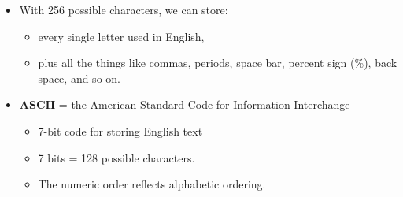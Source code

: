 \documentclass[a4paper,landscape,headrule,footrule,xetex]{foils}
\begin{document}

\begin{itemize}
\item  With 256 possible characters, we can store:
  \begin{itemize}
  \item every single letter used in English,
  \item plus all the things like commas, periods, space bar, percent sign (\%), back space, and so on.
  \end{itemize}
\item \textbf{ASCII} = the American Standard Code for Information Interchange
  \begin{itemize}
  \item  7-bit code for storing English text
  \item 7 bits = 128 possible characters.
  \item The numeric order reflects alphabetic ordering.
  \end{itemize}
\end{itemize}
\end{document}

